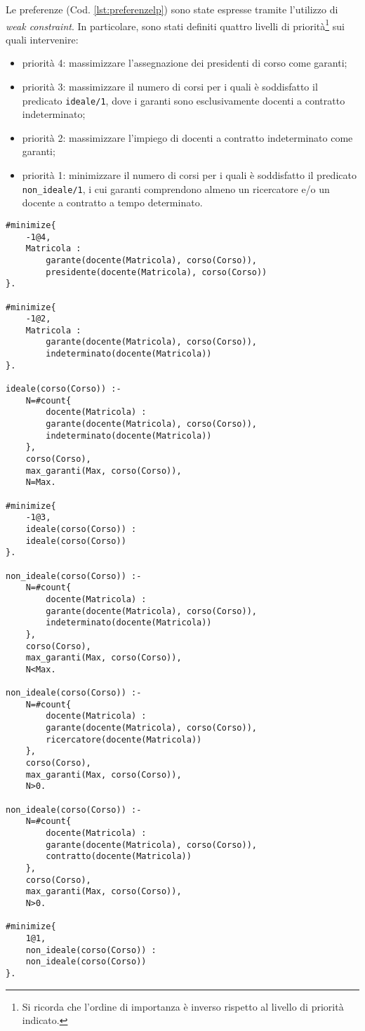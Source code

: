 Le preferenze (Cod. \ref{lst:preferenzelp}) sono state espresse tramite l'utilizzo di \textit{weak constraint}. In particolare, sono stati definiti quattro livelli di priorità\footnote{Si ricorda che l'ordine di importanza è inverso rispetto al livello di priorità indicato.} sui quali intervenire:
\begin{itemize}
    \item priorità 4: massimizzare l'assegnazione dei presidenti di corso come garanti;
    \item priorità 3: massimizzare il numero di corsi per i quali è soddisfatto il predicato \texttt{ideale/1}, dove i garanti sono esclusivamente docenti a contratto indeterminato;
    \item priorità 2: massimizzare l'impiego di docenti a contratto indeterminato come garanti;
    \item priorità 1: minimizzare il numero di corsi per i quali è soddisfatto il predicato \texttt{non\_ideale/1}, i cui garanti comprendono almeno un ricercatore e/o un docente a contratto a tempo determinato.
\end{itemize}

\begin{lstlisting}[style=asp, caption={Codice ASP del file \texttt{preferenze.lp}.}, label={lst:preferenzelp}]
#minimize{
	-1@4,
	Matricola :
		garante(docente(Matricola), corso(Corso)),
		presidente(docente(Matricola), corso(Corso))
}.

#minimize{
	-1@2,
	Matricola :
		garante(docente(Matricola), corso(Corso)),
		indeterminato(docente(Matricola))
}.

ideale(corso(Corso)) :-
	N=#count{
		docente(Matricola) :
		garante(docente(Matricola), corso(Corso)),
		indeterminato(docente(Matricola))
	},
	corso(Corso),
	max_garanti(Max, corso(Corso)),
	N=Max.

#minimize{
	-1@3,
	ideale(corso(Corso)) :
	ideale(corso(Corso))
}.

non_ideale(corso(Corso)) :-
	N=#count{
		docente(Matricola) :
		garante(docente(Matricola), corso(Corso)),
		indeterminato(docente(Matricola))
	},
	corso(Corso),
	max_garanti(Max, corso(Corso)),
	N<Max.

non_ideale(corso(Corso)) :-
	N=#count{
		docente(Matricola) :
		garante(docente(Matricola), corso(Corso)),
		ricercatore(docente(Matricola))
	},
	corso(Corso),
	max_garanti(Max, corso(Corso)),
	N>0.

non_ideale(corso(Corso)) :-
	N=#count{
		docente(Matricola) :
		garante(docente(Matricola), corso(Corso)),
		contratto(docente(Matricola))
	},
	corso(Corso),
	max_garanti(Max, corso(Corso)),
	N>0.

#minimize{
	1@1,
	non_ideale(corso(Corso)) :
	non_ideale(corso(Corso))
}.
\end{lstlisting}


